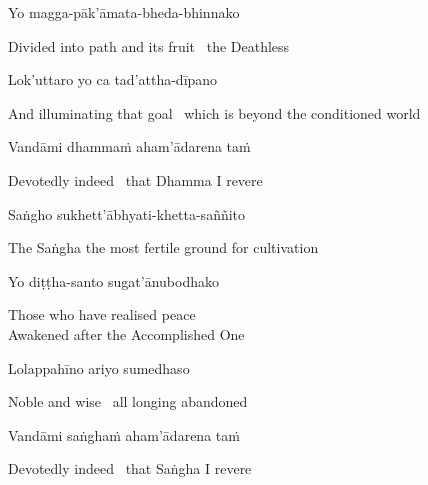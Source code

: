Yo magga-pāk'āmata-bheda-bhinnako

\begin{english}
  Divided into path and its fruit \breathmark\ the Deathless\ifdigitalversion\makeatletter\hyperlink{endnote9-appendix}\makeatother\fi
\end{english}

Lok'uttaro yo ca tad'attha-dīpano

\begin{english}
  And illuminating that goal \breathmark\ which is beyond the conditioned world\ifdigitalversion\makeatletter\hyperlink{endnote10-appendix}\makeatother\fi
\end{english}

\ifbsixversion\clearpage\fi

Vandāmi dhammaṁ aham'ādarena taṁ

\begin{english}
  Devotedly indeed \breathmark\ that Dhamma I revere
\end{english}

Saṅgho sukhett'ābhyati-khetta-saññito

\begin{english}
  The Saṅgha the most fertile ground for cultivation
\end{english}

Yo diṭṭha-santo sugat'ānubodhako

\begin{english}
  Those who have realised peace\\
  Awakened after the Accomplished One
\end{english}

Lolappahīno ariyo sumedhaso

\begin{english}
  Noble and wise \breathmark\ all longing abandoned
\end{english}

Vandāmi saṅghaṁ aham'ādarena taṁ

\begin{english}
  Devotedly indeed \breathmark\ that Saṅgha I revere
\end{english}

